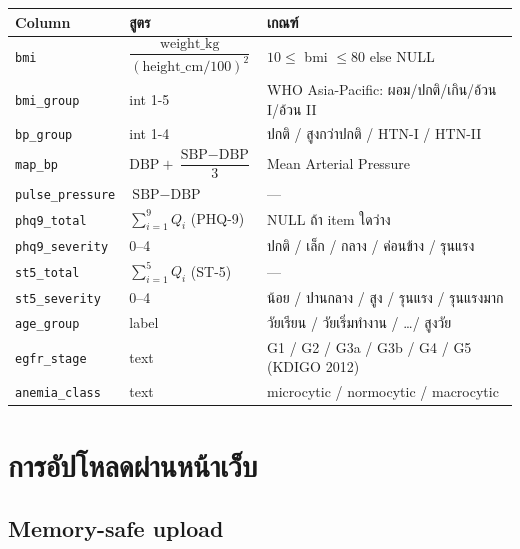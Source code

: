 \documentclass[11pt,a4paper]{article}
\begin{document}
\begin{center}
\footnotesize
\begin{tabularx}{\linewidth}{l L{5cm} X}
\toprule
\textbf{Column} & \textbf{สูตร} & \textbf{เกณฑ์} \\
\midrule
\texttt{bmi}            & $\dfrac{\text{weight\_kg}}{(\text{height\_cm}/100)^2}$ & $10 \le$ bmi $\le 80$ else NULL \\
\texttt{bmi\_group}     & int 1-5            & WHO Asia-Pacific: ผอม/ปกติ/เกิน/อ้วน I/อ้วน II \\
\texttt{bp\_group}      & int 1-4            & ปกติ / สูงกว่าปกติ / HTN-I / HTN-II \\
\texttt{map\_bp}        & $\text{DBP} + \dfrac{\text{SBP}-\text{DBP}}{3}$ & Mean Arterial Pressure \\
\texttt{pulse\_pressure} & $\text{SBP} - \text{DBP}$                       & --- \\
\texttt{phq9\_total}    & $\sum_{i=1}^{9} Q_i$ (PHQ-9) & NULL ถ้า item ใดว่าง \\
\texttt{phq9\_severity} & 0--4               & ปกติ / เล็ก / กลาง / ค่อนข้าง / รุนแรง \\
\texttt{st5\_total}     & $\sum_{i=1}^{5} Q_i$ (ST-5) & --- \\
\texttt{st5\_severity}  & 0--4               & น้อย / ปานกลาง / สูง / รุนแรง / รุนแรงมาก \\
\texttt{age\_group}     & label              & วัยเรียน / วัยเริ่มทำงาน / \ldots / สูงวัย \\
\texttt{egfr\_stage}    & text               & G1 / G2 / G3a / G3b / G4 / G5 (KDIGO 2012) \\
\texttt{anemia\_class}  & text               & microcytic / normocytic / macrocytic \\
\bottomrule
\end{tabularx}
\end{center}

\section{การอัปโหลดผ่านหน้าเว็บ}

\subsection{Memory-safe upload}
\end{document}
